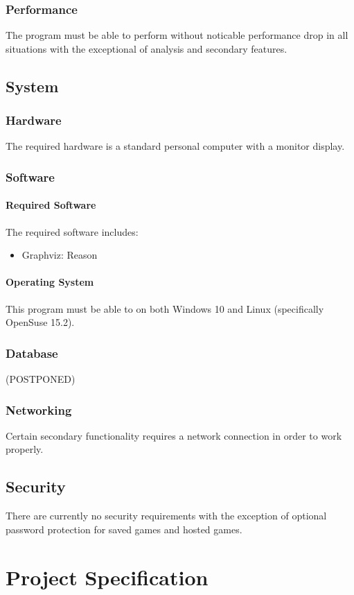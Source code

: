 \documentclass{article}
\begin{document}
\subsubsection{Performance}
The program must be able to perform without noticable performance drop in all situations with the exceptional of analysis and secondary features.
\subsection{System}
\subsubsection{Hardware}
The required hardware is a standard personal computer with a monitor display.
\subsubsection{Software}
\paragraph{Required Software}
The required software includes:
\begin{itemize}
\item Graphviz: Reason
\end{itemize}
\paragraph{Operating System}
This program must be able to on both Windows 10 and Linux (specifically OpenSuse 15.2).

\subsubsection{Database}
(POSTPONED)
\subsubsection{Networking}
Certain secondary functionality requires a network connection in order to work properly.

\subsection{Security}
There are currently no security requirements with the exception of optional password protection for saved games and hosted games.
\section{Project Specification}
\end{document}
